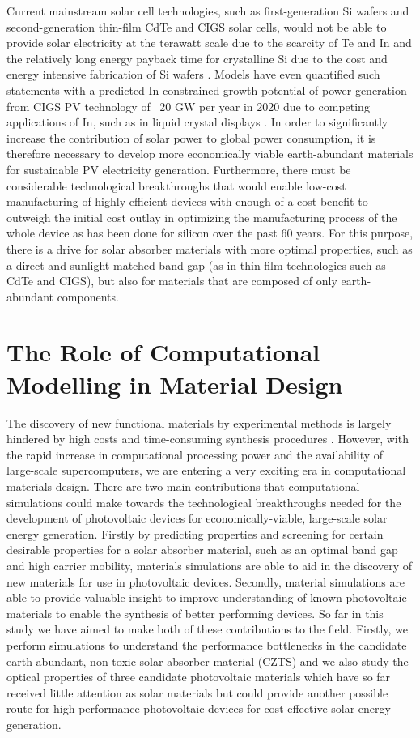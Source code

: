 Current mainstream solar cell technologies, such as first-generation Si wafers and second-generation thin-film CdTe and CIGS solar cells, would not be able to provide solar electricity at the terawatt scale due to the scarcity of Te and In and the relatively long energy payback time for crystalline Si due to the cost and energy intensive fabrication of Si wafers \cite{CZTS_vs_MAPI}. 
Models have even quantified such statements with a predicted In-constrained growth potential of power generation from CIGS PV technology of ~20 GW per year in 2020 due to competing applications of In, such as in liquid crystal displays \cite{culprit_5_3}.
In order to significantly increase the contribution of solar power to global power consumption, it is therefore necessary to develop more economically viable earth-abundant materials for sustainable PV electricity generation. Furthermore, there must be considerable technological breakthroughs that would enable low-cost manufacturing of highly efficient devices with enough of a cost benefit to outweigh the initial cost outlay in optimizing the manufacturing process of the whole device as has been done for silicon over the past 60 years. For this purpose, there is a drive for solar absorber materials with more optimal properties, such as a direct and sunlight matched band gap (as in thin-film technologies such as CdTe and CIGS), but also for materials that are composed of only earth-abundant components. 


\section{The Role of Computational Modelling in Material Design}
The discovery of new functional materials by experimental methods is largely hindered by high costs and time-consuming synthesis procedures \cite{high_tp}.
However, with the rapid increase in computational processing power and the availability of large-scale supercomputers, we are entering a very exciting era in computational materials design. 
There are two main contributions that computational simulations could make towards the technological breakthroughs needed for the development of photovoltaic devices for economically-viable, large-scale solar energy generation. Firstly by predicting properties and screening for certain desirable properties for a solar absorber material, such as an optimal band gap and high carrier mobility, materials simulations are able to aid in the discovery of new materials for use in photovoltaic devices. Secondly, material simulations are able to provide valuable insight to improve understanding of known photovoltaic materials to enable the synthesis of better performing devices. So far in this study we have aimed to make both of these contributions to the field. Firstly, we perform simulations to understand the performance bottlenecks in the candidate earth-abundant, non-toxic solar absorber material \CZTS (CZTS) and we also study the optical properties of three candidate photovoltaic materials which have so far received little attention as solar materials but could provide another possible route for high-performance photovoltaic devices for cost-effective solar energy generation.


